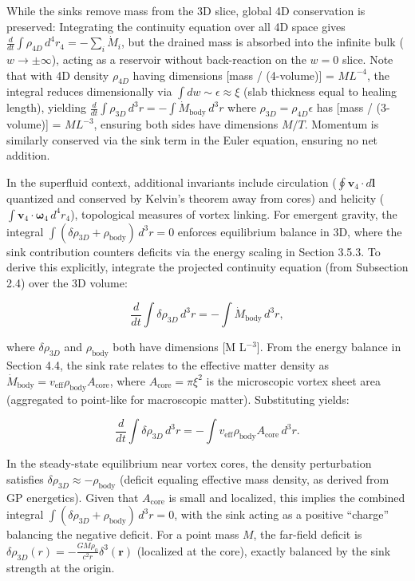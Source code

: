 \documentclass{article}
\begin{document}
While the sinks remove mass from the 3D slice, global 4D conservation is preserved: Integrating the continuity equation over all 4D space gives $\frac{d}{dt} \int \rho_{4D} \, d^4 r_4 = -\sum_i \dot{M}_i$, but the drained mass is absorbed into the infinite bulk ($w \to \pm \infty$), acting as a reservoir without back-reaction on the $w=0$ slice. Note that with 4D density $\rho_{4D}$ having dimensions [mass / (4-volume)] = $M L^{-4}$, the integral reduces dimensionally via $\int dw \sim \epsilon \approx \xi$ (slab thickness equal to healing length), yielding $\frac{d}{dt} \int \rho_{3D} \, d^3 r = -\int \dot{M}_{\text{body}} \, d^3 r$ where $\rho_{3D} = \rho_{4D} \epsilon$ has [mass / (3-volume)] = $M L^{-3}$, ensuring both sides have dimensions $M / T$. Momentum is similarly conserved via the sink term in the Euler equation, ensuring no net addition.

In the superfluid context, additional invariants include circulation ($\oint \mathbf{v}_4 \cdot d\mathbf{l}$ quantized and conserved by Kelvin's theorem away from cores) and helicity ($\int \mathbf{v}_4 \cdot \boldsymbol{\omega}_4 \, d^4 r_4$), topological measures of vortex linking. For emergent gravity, the integral $\int (\delta\rho_{3D} + \rho_{\text{body}}) \, d^3 r = 0$ enforces equilibrium balance in 3D, where the sink contribution counters deficits via the energy scaling in Section 3.5.3. To derive this explicitly, integrate the projected continuity equation (from Subsection 2.4) over the 3D volume:

\[
\frac{d}{dt} \int \delta\rho_{3D} \, d^3 r = - \int \dot{M}_{\text{body}} \, d^3 r,
\]

where $\delta\rho_{3D}$ and $\rho_{\text{body}}$ both have dimensions [M L$^{-3}$]. From the energy balance in Section 4.4, the sink rate relates to the effective matter density as $\dot{M}_{\text{body}} = v_{\text{eff}} \rho_{\text{body}} A_{\text{core}}$, where $A_{\text{core}} = \pi \xi^2$ is the microscopic vortex sheet area (aggregated to point-like for macroscopic matter). Substituting yields:

\[
\frac{d}{dt} \int \delta\rho_{3D} \, d^3 r = - \int v_{\text{eff}} \rho_{\text{body}} A_{\text{core}} \, d^3 r.
\]

In the steady-state equilibrium near vortex cores, the density perturbation satisfies $\delta\rho_{3D} \approx - \rho_{\text{body}}$ (deficit equaling effective mass density, as derived from GP energetics). Given that $A_{\text{core}}$ is small and localized, this implies the combined integral $\int (\delta\rho_{3D} + \rho_{\text{body}}) \, d^3 r = 0$, with the sink acting as a positive ``charge'' balancing the negative deficit. For a point mass $M$, the far-field deficit is $\delta\rho_{3D}(r) = - \frac{G M \rho_0}{c^2 r} \delta^3(\mathbf{r})$ (localized at the core), exactly balanced by the sink strength at the origin.
\end{document}
